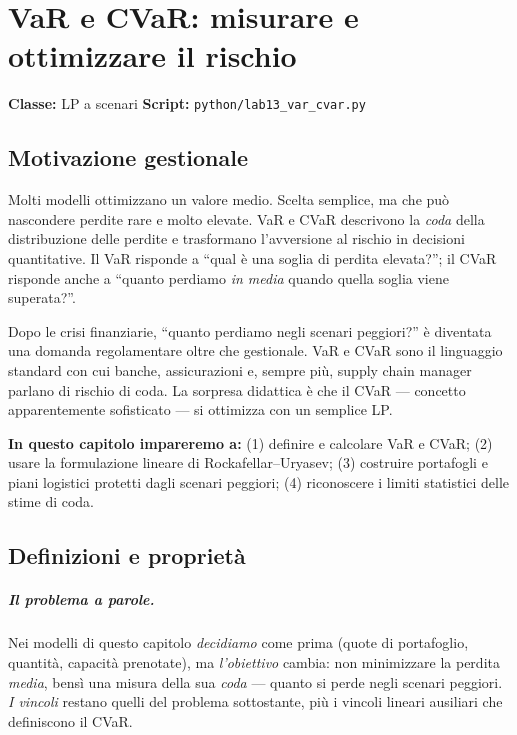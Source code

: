 \chapter[VaR e CVaR]{VaR e CVaR: misurare e ottimizzare il rischio}
\label{cap:varcvar}

\noindent\textbf{Classe:} LP a scenari \hfill
\textbf{Script:} \texttt{python/lab13\_var\_cvar.py}

\section{Motivazione gestionale}

Molti modelli ottimizzano un valore medio. Scelta semplice, ma che può nascondere
perdite rare e molto elevate. VaR e CVaR descrivono la \emph{coda} della
distribuzione delle perdite e trasformano l'avversione al rischio in decisioni
quantitative. Il VaR risponde a ``qual è una soglia di perdita elevata?'';
il CVaR risponde anche a ``quanto perdiamo \emph{in media} quando quella soglia viene
superata?''.



Dopo le crisi finanziarie, ``quanto perdiamo negli scenari peggiori?'' è diventata
una domanda regolamentare oltre che gestionale. VaR e CVaR sono il linguaggio
standard con cui banche, assicurazioni e, sempre più, supply chain manager parlano
di rischio di coda. La sorpresa didattica è che il CVaR --- concetto
apparentemente sofisticato --- si ottimizza con un semplice LP.

\textbf{In questo capitolo impareremo a:} (1) definire e calcolare VaR e CVaR;
(2) usare la formulazione lineare di Rockafellar--Uryasev; (3) costruire portafogli
e piani logistici protetti dagli scenari peggiori; (4) riconoscere i limiti
statistici delle stime di coda.

\section{Definizioni e proprietà}

\paragraph{Il problema a parole.} Nei modelli di questo capitolo \emph{decidiamo}
come prima (quote di portafoglio, quantità, capacità prenotate), ma
\emph{l'obiettivo} cambia: non minimizzare la perdita \emph{media}, bensì una misura
della sua \emph{coda} --- quanto si perde negli scenari peggiori. \emph{I vincoli}
restano quelli del problema sottostante, più i vincoli lineari ausiliari che
definiscono il CVaR.


